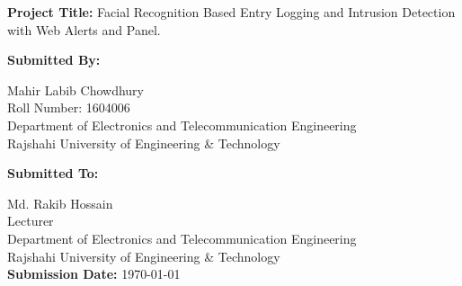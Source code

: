 \begin{titlepage}
\begin{center}
    \end{center}

    \begin{flushleft}
        \begin{Large}
            \textbf{Project Title:} Facial Recognition Based Entry Logging and Intrusion Detection with Web Alerts and Panel.\\
            \vspace{.4cm}
        \end{Large}
        \begin{large}
            \textbf{Submitted By:}\\
        \end{large}
        Mahir Labib Chowdhury\\
        Roll Number: 1604006\\
        Department of Electronics and Telecommunication Engineering\\
        Rajshahi University of Engineering \& Technology\\

        \vspace{.4cm}

        \begin{large}
            \textbf{Submitted To:}\\
        \end{large}
        Md. Rakib Hossain\\
        Lecturer\\
        Department of Electronics and Telecommunication Engineering\\
        Rajshahi University of Engineering \& Technology\\
        \vspace{.3cm}
        \textbf{Submission Date: }\today
    \end{flushleft}
\end{titlepage}